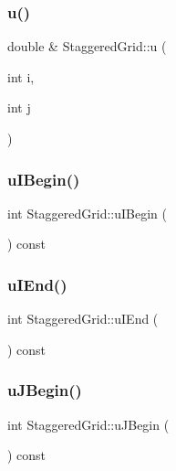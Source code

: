 \subsubsection{\texorpdfstring{u()}{u()}\hspace{0.1cm}{\footnotesize\ttfamily [3/3]}}
{\footnotesize\ttfamily double \& Staggered\+Grid\+::u (\begin{DoxyParamCaption}\item[{int}]{i,  }\item[{int}]{j }\end{DoxyParamCaption})}

\mbox{\label{classStaggeredGrid_a31e2d3a0b6e03685380810a7c2f323e1}} 
\subsubsection{\texorpdfstring{uIBegin()}{uIBegin()}}
{\footnotesize\ttfamily int Staggered\+Grid\+::u\+I\+Begin (\begin{DoxyParamCaption}{ }\end{DoxyParamCaption}) const}

\mbox{\label{classStaggeredGrid_a641e473d72e1d02ba3de1c16e9d0d332}} 
\subsubsection{\texorpdfstring{uIEnd()}{uIEnd()}}
{\footnotesize\ttfamily int Staggered\+Grid\+::u\+I\+End (\begin{DoxyParamCaption}{ }\end{DoxyParamCaption}) const}

\mbox{\label{classStaggeredGrid_a9b0e97704e1871441a8e713ecaa2cff5}} 
\subsubsection{\texorpdfstring{uJBegin()}{uJBegin()}}
{\footnotesize\ttfamily int Staggered\+Grid\+::u\+J\+Begin (\begin{DoxyParamCaption}{ }\end{DoxyParamCaption}) const}

